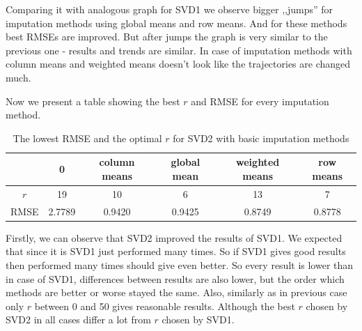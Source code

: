 \documentclass[10pt]{amsart}
\begin{document}
Comparing it with analogous graph for SVD1 we observe bigger ,,jumps'' for imputation methods using global means and row means.
And for these methods best RMSEs are improved.
But after jumps the graph is very similar to the previous one - results and trends are similar.
In case of imputation methods with column means and weighted means doesn't look like the trajectories are changed much.

Now we present a table showing the best $r$ and RMSE for every imputation method.
\begin{table}[H]
\begin{tabular}{c|ccccc}
& 0 & column means & global mean & weighted means & row means \\
\hline
$r$ & 19 & 10 & 6 & 13 & 7 \\
RMSE & 2.7789 & 0.9420 & 0.9425 & 0.8749 & 0.8778 \\
\end{tabular}
\caption{The lowest RMSE and the optimal $r$ for SVD2 with basic imputation methods}
\end{table}

Firstly, we can observe that SVD2 improved the results of SVD1.
We expected that since it is SVD1 just performed many times.
So if SVD1 gives good results then performed many times should give even better.
So every result is lower than in case of SVD1, differences between results are also lower, but the order which methods are better or worse stayed the same.
Also, similarly as in previous case only $r$ between 0 and 50 gives reasonable results.
Although the best $r$ chosen by SVD2 in all cases differ a lot from $r$ chosen by SVD1.
\end{document}
